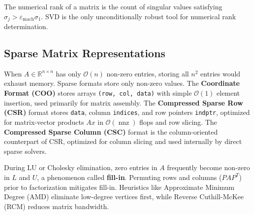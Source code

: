 The numerical rank of a matrix is the count of singular values satisfying $\sigma_j > \varepsilon_{\text{mach}} \sigma_1$. SVD is the only unconditionally robust tool for numerical rank determination.

\subsection{Sparse Matrix Representations}

When $A \in \mathbb{R}^{n \times n}$ has only $\mathcal{O}(n)$ non-zero entries, storing all $n^2$ entries would exhaust memory. Sparse formats store only non-zero values. The \textbf{Coordinate Format (COO)} stores arrays \texttt{(row, col, data)} with simple $\mathcal{O}(1)$ element insertion, used primarily for matrix assembly. The \textbf{Compressed Sparse Row (CSR)} format stores \texttt{data}, column \texttt{indices}, and row pointers \texttt{indptr}, optimized for matrix-vector products $A x$ in $\mathcal{O}(\operatorname{nnz})$ flops and row slicing. The \textbf{Compressed Sparse Column (CSC)} format is the column-oriented counterpart of CSR, optimized for column slicing and used internally by direct sparse solvers.

During LU or Cholesky elimination, zero entries in $A$ frequently become non-zero in $L$ and $U$, a phenomenon called \textbf{fill-in}. Permuting rows and columns ($P A P^T$) prior to factorization mitigates fill-in. Heuristics like Approximate Minimum Degree (AMD) eliminate low-degree vertices first, while Reverse Cuthill-McKee (RCM) reduces matrix bandwidth.
